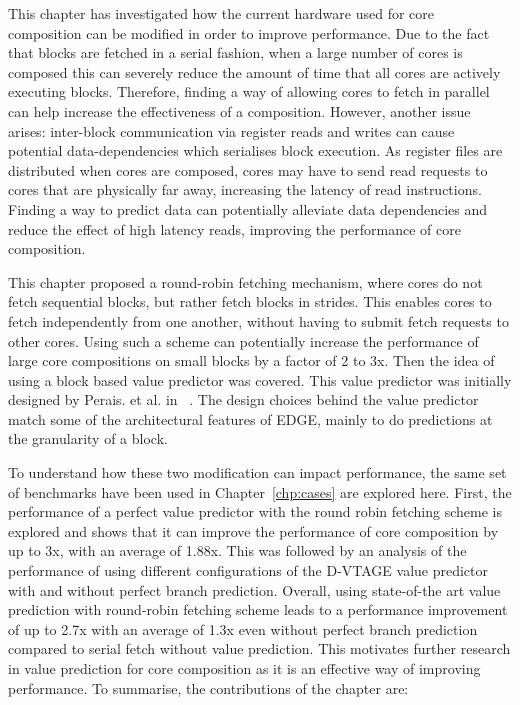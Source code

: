 This chapter has investigated how the current hardware used for core composition can be modified in order to improve performance.
Due to the fact that blocks are fetched in a serial fashion, when a large number of cores is composed this can severely reduce the amount of time that all cores are actively executing blocks.
Therefore, finding a way of allowing cores to fetch in parallel can help increase the effectiveness of a composition.
However, another issue arises: inter-block communication via register reads and writes can cause potential data-dependencies which serialises block execution.
As register files are distributed when cores are composed, cores may have to send read requests to cores that are physically far away, increasing the latency of read instructions.
Finding a way to predict data can potentially alleviate data dependencies and reduce the effect of high latency reads, improving the performance of core composition.

This chapter proposed a round-robin fetching mechanism, where cores do not fetch sequential blocks, but rather fetch blocks in strides.
This enables cores to fetch independently from one another, without having to submit fetch requests to other cores.
Using such a scheme can potentially increase the performance of large core compositions on small blocks by a factor of 2 to 3x.
Then the idea of using a block based value predictor was covered.
This value predictor was initially designed by Perais. et al. in ~\cite{peraisVTAGE2014, peraisBeBop2015}.
The design choices behind the value predictor match some of the architectural features of EDGE, mainly to do predictions at the granularity of a block.

To understand how these two modification can impact performance, the same set of benchmarks have been used in Chapter~\ref{chp:cases} are explored here.
First, the performance of a perfect value predictor with the round robin fetching scheme is explored and shows that it can improve the performance of core composition by up to 3x, with an average of 1.88x.
This was followed by an analysis of the performance of using different configurations of the D-VTAGE value predictor with and without perfect branch prediction.
Overall, using state-of-the art value prediction with round-robin fetching scheme leads to a performance improvement of up to 2.7x with an average of 1.3x even without perfect branch prediction compared to serial fetch without value prediction.
This motivates further research in value prediction for core composition as it is an effective way of improving performance.
To summarise, the contributions of the chapter are:

